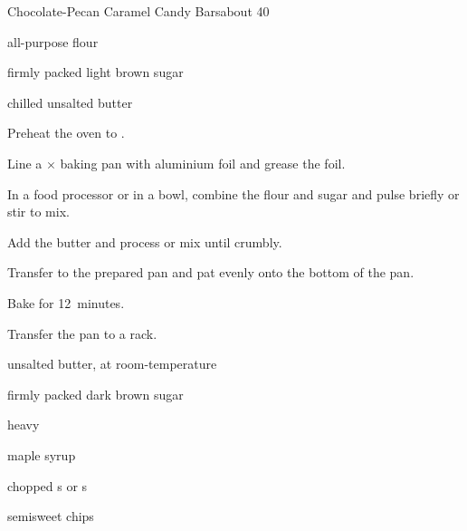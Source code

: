 \begin{recipe}{Chocolate-Pecan Caramel Candy Bars}{}{about 40}


\begin{ingredients}
\item \C{1 \half} all-purpose flour
\item \C{\half} firmly packed light brown sugar
\item \C{\half} chilled unsalted butter
\end{ingredients}

\begin{directions}
\item Preheat the oven to .
\item Line a $\times$ baking pan with aluminium foil and grease the foil.
\item In a food processor or in a bowl, combine the flour and sugar and pulse briefly or stir to mix.
\item Add the butter and process or mix until crumbly.
\item Transfer to the prepared pan and pat evenly onto the bottom of the pan.
\item Bake for 12~minutes.
\item Transfer the pan to a rack.
\end{directions}


\begin{ingredients}
\item {} unsalted butter, at room-temperature
\item {} firmly packed dark brown sugar
\item {} 
\item {} heavy 
\item {} maple syrup
\item \C{1 \half} chopped s or s
\item \C{\half} semisweet  chips
\end{ingredients}


\end{recipe}
